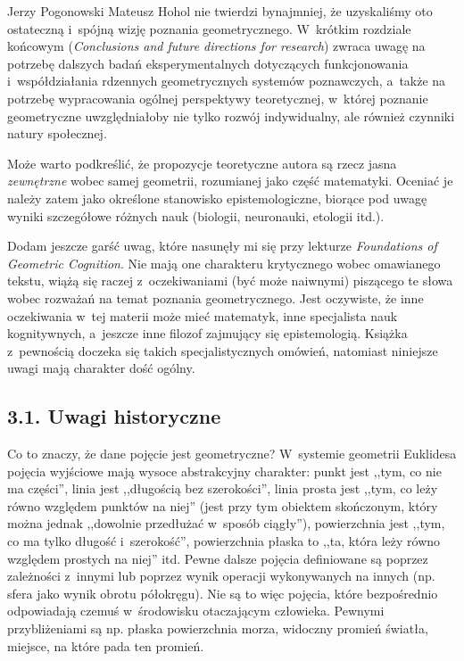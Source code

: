 \begin{newrevplenv}{Jerzy Pogonowski}
Mateusz Hohol nie twierdzi bynajmniej, że uzyskaliśmy oto
ostateczną i~spójną wizję poznania geometrycznego. W~krótkim
rozdziale końcowym ({\em Conclusions and future directions for
research}) zwraca uwagę na potrzebę dalszych badań
eksperymentalnych dotyczących funkcjonowania i~współdziałania
rdzennych geometrycznych systemów poznawczych, a~także na potrzebę
wypracowania ogólnej perspektywy teoretycznej, w~której poznanie
geometryczne uwzględniałoby nie tylko rozwój indywidualny, ale
również czynniki natury społecznej.

Może warto podkreślić, że propozycje teoretyczne autora są rzecz
jasna {\em zewnętrzne} wobec samej geometrii, rozumianej jako
część matematyki. Oceniać je należy zatem jako określone
stanowisko epistemologiczne, biorące pod uwagę wyniki szczegółowe
różnych nauk (biologii, neuronauki, etologii itd.).

Dodam jeszcze garść uwag, które nasunęły mi się przy lekturze {\em
Foundations of Geometric Cognition}. Nie mają one charakteru
krytycznego wobec omawianego tekstu, wiążą się raczej z~oczekiwaniami (być może naiwnymi) piszącego te słowa wobec
rozważań na temat poznania geometrycznego. Jest oczywiste, że inne
oczekiwania w~tej materii może mieć matematyk, inne specjalista
nauk kognitywnych, a~jeszcze inne filozof zajmujący się
epistemologią. Książka z~pewnością doczeka się takich
specjalistycznych omówień, natomiast niniejsze uwagi mają
charakter dość ogólny.

\subsection{3.1. Uwagi historyczne}

Co to znaczy, że dane pojęcie jest geometryczne? W~systemie
geometrii Euklidesa pojęcia wyjściowe mają wysoce abstrakcyjny
charakter: punkt jest ,,tym, co nie ma części'', linia jest
,,długością bez szerokości'', linia prosta jest ,,tym, co leży
równo względem punktów na niej'' (jest przy tym obiektem
skończonym, który można jednak ,,dowolnie przedłużać w~sposób
ciągły''), powierzchnia jest ,,tym, co ma tylko długość i~szerokość'', powierzchnia płaska to ,,ta, która leży równo
względem prostych na niej'' itd. Pewne dalsze pojęcia definiowane
są poprzez zależności z~innymi lub poprzez wynik operacji
wykonywanych na innych (np. sfera jako wynik obrotu półokręgu).
Nie są to więc pojęcia, które bezpośrednio odpowiadają czemuś w~środowisku otaczającym człowieka. Pewnymi przybliżeniami są np.
płaska powierzchnia morza, widoczny promień światła, miejsce, na
które pada ten promień.


\end{newrevplenv}
